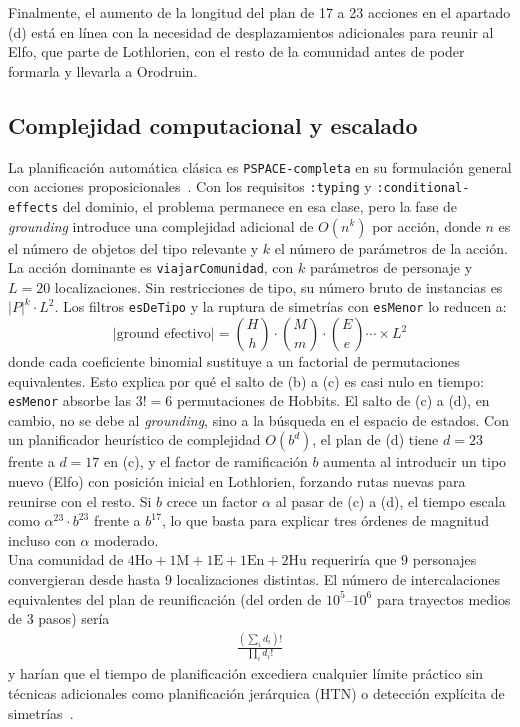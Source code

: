 \documentclass[10pt]{article}
\begin{document}
Finalmente, el aumento de la longitud del plan de 17 a 23 acciones en el apartado (d) está en línea con la necesidad de desplazamientos adicionales para reunir al Elfo, que parte de Lothlorien, con el resto de la comunidad antes de poder formarla y llevarla a Orodruin.\\

\subsection{Complejidad computacional y escalado}

La planificación automática clásica es \texttt{PSPACE-completa} en su formulación general con acciones proposicionales~\cite{bylander1994}. Con los requisitos \texttt{:typing} y \texttt{:conditional-effects} del dominio, el problema permanece en esa clase, pero la fase de \textit{grounding} introduce una complejidad adicional de $O(n^k)$ por acción, donde $n$ es el número de objetos del tipo relevante y $k$ el número de parámetros de la acción.\\

La acción dominante es \texttt{viajarComunidad}, con $k$ parámetros de personaje y $L=20$ localizaciones. Sin restricciones de tipo, su número bruto de instancias es $|P|^k \cdot L^2$. Los filtros \texttt{esDeTipo} y la ruptura de simetrías con \texttt{esMenor} lo reducen a:
\[
  |\text{ground efectivo}| = \binom{H}{h}\cdot\binom{M}{m}\cdot\binom{E}{e}\cdots\times L^2
\]
donde cada coeficiente binomial sustituye a un factorial de permutaciones equivalentes. Esto explica por qué el salto de (b) a (c) es casi nulo en tiempo: \texttt{esMenor} absorbe las $3!=6$ permutaciones de Hobbits. El salto de (c) a (d), en cambio, no se debe al \textit{grounding}, sino a la búsqueda en el espacio de estados. Con un planificador heurístico de complejidad $O(b^d)$, el plan de (d) tiene $d=23$ frente a $d=17$ en (c), y el factor de ramificación $b$ aumenta al introducir un tipo nuevo (Elfo) con posición inicial en Lothlorien, forzando rutas nuevas para reunirse con el resto. Si $b$ crece un factor $\alpha$ al pasar de (c) a (d), el tiempo escala como $\alpha^{23}\cdot b^{23}$ frente a $b^{17}$, lo que basta para explicar tres órdenes de magnitud incluso con $\alpha$ moderado.\\

Una comunidad de $4\text{Ho}+1\text{M}+1\text{E}+1\text{En}+2\text{Hu}$ requeriría que 9 personajes convergieran desde hasta 9 localizaciones distintas. El número de intercalaciones equivalentes del plan de reunificación (del orden de $10^5$--$10^6$ para trayectos medios de 3 pasos) sería
\begin{gather*}
    \frac{(\sum_i d_i)!}{\prod_i d_i!}
\end{gather*}
y harían que el tiempo de planificación excediera cualquier límite práctico sin técnicas adicionales como planificación jerárquica (HTN) o detección explícita de simetrías~\cite{shleyfman2015}.
\end{document}
